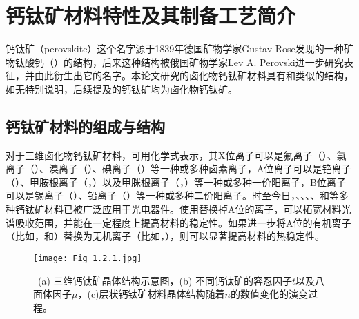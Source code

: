 \documentclass[forlib]{WHUMaster}   %
\begin{document}
\section{钙钛矿材料特性及其制备工艺简介}

{\songti{}钙钛矿（perovskite）这个名字源于1839年德国矿物学家Gustav Rose发现的一种矿物钛酸钙（）的结构，后来这种结构被俄国矿物学家Lev A. Perovski进一步研究表征，并由此衍生出它的名字\cite{RN52}。本论文研究的卤化物钙钛矿材料具有和类似的结构，如无特别说明，后续提及的钙钛矿均为卤化物钙钛矿。}

\subsection{钙钛矿材料的组成与结构}%

{\songti{}对于三维卤化物钙钛矿材料，可用化学式表示，其X位离子可以是氟离子（）、氯离子（）、溴离子（）、碘离子（）等一种或多种卤素离子，A位离子可以是铯离子（）、甲胺根离子（，）以及甲脒根离子（，）等一种或多种一价阳离子，B位离子可以是锡离子（）、铅离子（）等一种或多种二价阳离子\cite{RN118,RN137}。时至今日，\cite{RN139,RN122,RN123}、\cite{RN124,RN125}、\cite{RN126,RN127,RN128}、\cite{RN129}、和\cite{RN61,RN130,RN131,RN132}等多种钙钛矿材料已被广泛应用于光电器件。使用替换掉A位的离子，可以拓宽材料光谱吸收范围，并能在一定程度上提高材料的稳定性\cite{RN133}。如果进一步将A位的有机离子（比如，和）替换为无机离子（比如，），则可以显著提高材料的热稳定性\cite{RN134}。}



\begin{figure}[htb]
\centering
  \texttt{[image: Fig\_1.2.1.jpg]}
  \caption{\rm \ (a) 三维钙钛矿晶体结构示意图，(b) 不同钙钛矿的容忍因子$t$以及八面体因子$\mu$\cite{RN136}，(c)层状钙钛矿材料晶体结构随着$n$的数值变化的演变过程\cite{RN135}。}
  \label{fig:1.2.1}
\end{figure}
\end{document}
